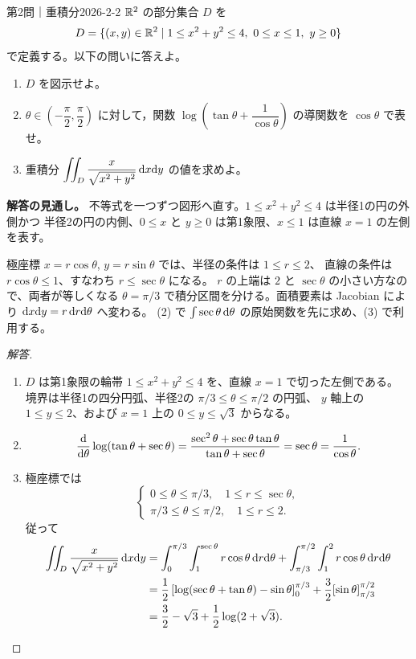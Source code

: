 \begin{problem}{第2問｜重積分}{2026-2-2}
$\mathbb{R}^2$ の部分集合 $D$ を
\[
D=\{(x,y)\in\R^2\mid1\le x^2+y^2\le4,\ 0\le x\le1,\ y\ge0\}
\]
で定義する。以下の問いに答えよ。
\begin{enumerate}
  \item[(1)] $D$ を図示せよ。
  \item[(2)] $\theta\in\left(-\dfrac\pi2,\dfrac\pi2\right)$ に対して，関数 $\log\left(\tan\theta+\dfrac1{\cos\theta}\right)$ の導関数を $\cos\theta$ で表せ。
  \item[(3)] 重積分 $\displaystyle\iint_D\frac{x}{\sqrt{x^2+y^2}}\,\mathrm{d} x\mathrm{d} y$ の値を求めよ。
\end{enumerate}
\end{problem}
\begin{memo*}
\textbf{解答の見通し。}
不等式を一つずつ図形へ直す。$1\le x^2+y^2\le4$ は半径1の円の外側かつ
半径2の円の内側、$0\le x$ と $y\ge0$ は第1象限、$x\le1$ は直線 $x=1$ の左側を表す。

極座標 $x=r\cos\theta$, $y=r\sin\theta$ では、半径の条件は $1\le r\le2$、
直線の条件は $r\cos\theta\le1$、すなわち $r\le\sec\theta$ になる。
$r$ の上端は $2$ と $\sec\theta$ の小さい方なので、両者が等しくなる
$\theta=\pi/3$ で積分区間を分ける。面積要素は Jacobian により
$\mathrm{d} x\mathrm{d} y=r\,\mathrm{d} r\mathrm{d}\theta$ へ変わる。
(2) で $\int\sec\theta\,\mathrm{d}\theta$ の原始関数を先に求め、(3) で利用する。
\end{memo*}
\begin{proof}[解答]
\begin{enumerate}
  \item[(1)] $D$ は第1象限の輪帯 $1\le x^2+y^2\le4$ を、直線 $x=1$ で切った左側である。
  境界は半径1の四分円弧、半径2の $\pi/3\le\theta\le\pi/2$ の円弧、
  $y$ 軸上の $1\le y\le2$、および $x=1$ 上の $0\le y\le\sqrt3$ からなる。

  \item[(2)]
  \[
  \frac{\mathrm{d}}{\mathrm{d}\theta}\log(\tan\theta+\sec\theta)
  =\frac{\sec^2\theta+\sec\theta\tan\theta}
         {\tan\theta+\sec\theta}
  =\sec\theta=\frac1{\cos\theta}.
  \]

  \item[(3)] 極座標では
  \[
  \begin{cases}
  0\le\theta\le\pi/3,\quad 1\le r\le\sec\theta,\\
  \pi/3\le\theta\le\pi/2,\quad 1\le r\le2.
  \end{cases}
  \]
  従って
  \begin{align*}
  \iint_D\frac{x}{\sqrt{x^2+y^2}}\,\mathrm{d} x\mathrm{d} y
  &=\int_0^{\pi/3}\int_1^{\sec\theta}r\cos\theta\,\mathrm{d} r\mathrm{d}\theta
    +\int_{\pi/3}^{\pi/2}\int_1^2r\cos\theta\,\mathrm{d} r\mathrm{d}\theta\\
  &=\frac12\left[\log(\sec\theta+\tan\theta)-\sin\theta\right]_0^{\pi/3}
    +\frac32[\sin\theta]_{\pi/3}^{\pi/2}\\
  &=\frac32-\sqrt3+\frac12\log(2+\sqrt3).
  \end{align*}
\end{enumerate}
\end{proof}

